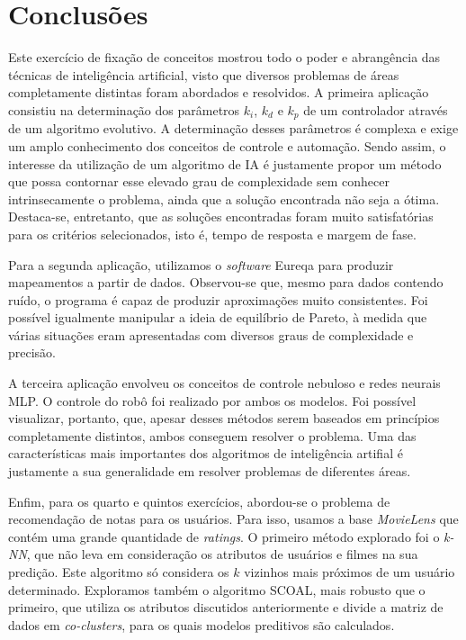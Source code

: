 \section{Conclusões}

Este exercício de fixação de conceitos mostrou todo o poder e abrangência das
técnicas de inteligência artificial, visto que diversos problemas de áreas
completamente distintas foram abordados e resolvidos. A primeira aplicação
consistiu na determinação dos parâmetros \(k_i\), \(k_d\) e \(k_p\) de um
controlador através de um algoritmo evolutivo. A determinação desses parâmetros
é complexa e exige um amplo conhecimento dos conceitos de controle e automação.
Sendo assim, o interesse da utilização de um algoritmo de IA é justamente propor
um método que possa contornar esse elevado grau de complexidade sem conhecer
intrinsecamente o problema, ainda que a solução encontrada não seja a ótima.
Destaca-se, entretanto, que as soluções encontradas foram muito satisfatórias
para os critérios selecionados, isto é, tempo de resposta e margem de fase.

\vspace{12pt}

Para a segunda aplicação, utilizamos o \textit{software} Eureqa para produzir
mapeamentos a partir de dados. Observou-se que, mesmo para dados contendo ruído,
o programa é capaz de produzir aproximações muito consistentes. Foi possível
igualmente manipular a ideia de equilíbrio de Pareto, à medida que várias
situações eram apresentadas com diversos graus de complexidade e precisão.

\vspace{12pt}

A terceira aplicação envolveu os conceitos de controle nebuloso e redes neurais
MLP. O controle do robô foi realizado por ambos os modelos. Foi possível
visualizar, portanto, que, apesar desses métodos serem baseados em princípios
completamente distintos, ambos conseguem resolver o problema. Uma das
características mais importantes dos algoritmos de inteligência artifial é
justamente a sua generalidade em resolver problemas de diferentes áreas.

\vspace{12pt}

Enfim, para os quarto e quintos exercícios, abordou-se o problema de
recomendação de notas para os usuários. Para isso, usamos a base
\textit{MovieLens} que contém uma grande quantidade de \textit{ratings}. O
primeiro método explorado foi o \textit{k-NN}, que não leva em consideração os
atributos de usuários e filmes na sua predição. Este algoritmo só considera os
\(k\) vizinhos mais próximos de um usuário determinado. Exploramos também o
algoritmo SCOAL, mais robusto que o primeiro, que utiliza os atributos
discutidos anteriormente e divide a matriz de dados em \textit{co-clusters},
para os quais modelos preditivos são calculados.
